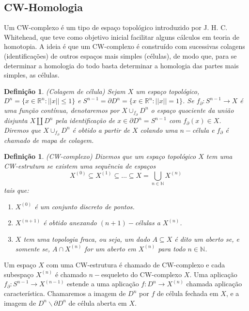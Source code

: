 \documentclass[12pt]{book}
\newtheorem{definicao}[teorema]{Definição}
\newcommand{\complementar}[2]{#1 \backslash #2}
\newcommand{\skeleton}[1]{X^{(#1)}}
\begin{document}
	\subsection{CW-Homologia}\label{secao_cw_complexo}
	Um CW-complexo é um tipo de espaço topológico introduzido por J. H. C. Whitehead, que teve como objetivo inicial facilitar alguns cálculos em teoria de homotopia. A ideia é que um CW-complexo é construído com sucessivas colagens (identificações) de outros espaços mais simples (células), de modo que, para se determinar a homologia do todo basta determinar a homologia das partes mais simples, as células.
	\begin{definicao}
		(Colagem de célula) Sejam $X$ um espaço topológico, $D^{n}=\{x\in \mathbb{R}^{n} : ||x|| \leq 1\}$ e $S^{n-1} = \partial D^{n}=\{x\in \mathbb{R}^{n} : ||x|| = 1\}$. Se $f_{\partial}:S^{n-1} \to X$ é uma função contínua, denotaremos por $X\cup_{f_{\partial}}D^{n}$ o espaço quociente da união disjunta $X \coprod D^{n}$ pela identificação de $x \in \partial D^{n} = S^{n-1}$ com $f_{\partial}(x) \in X$. Diremos que $X\cup_{f_{\partial}}D^{n}$ é obtido a partir de $X$ colando uma $n-$célula e $f_{\partial}$ é chamado de mapa de colagem.
	\end{definicao}
	
	\begin{definicao}
		(CW-complexo) Dizemos que um espaço topológico $X$ tem uma CW-estrutura se existem uma sequência de espaços
		$$
		\skeleton{0} \subseteq \skeleton{1} \subseteq \dots \subseteq X = \bigcup \limits_{n\in \mathbb{N}} \skeleton{n}
		$$ 
		tais que:
		\begin{enumerate}
			\item $\skeleton{0}$ é um conjunto discreto de pontos.
			
			\item $\skeleton{n+1}$ é obtido anexando $(n+1)-$células a $\skeleton{n}$.
			
			\item $X$ tem uma topologia fraca, ou seja, um dado $A \subseteq X$ é dito um aberto se, e somente se, $A \cap \skeleton{n}$ for um aberto em $\skeleton{n}$ para todo $n \in \mathbb{N}$.
		\end{enumerate}
	\end{definicao}
	
	Um espaço $X$ com uma CW-estrutura é chamado de CW-complexo e cada subespaço $\skeleton{n}$ é chamado $n-$esqueleto do CW-complexo $X$. Uma aplicação $f_{\partial}:S^{n-1} \to \skeleton{n-1}$ estende a uma aplicação $f:D^{n} \to \skeleton{n}$ chamada aplicação característica. Chamaremos a imagem de $D^{n}$ por $f$ de célula fechada em $X$, e a imagem de $\complementar{D^{n}}{\partial D^{n}} $ de célula aberta em $X$.
	
\end{document}
